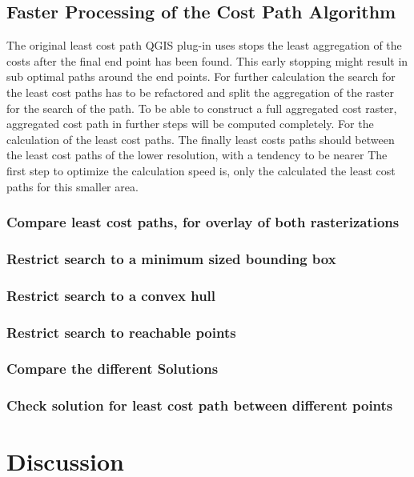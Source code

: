 \documentclass[acmtog]{acmart}
\begin{document}

	\subsection{Faster Processing of the Cost Path Algorithm}
	The original least cost path QGIS plug-in uses stops the least aggregation of the costs after the final end point has been found.
	This early stopping might result in sub optimal paths around the end points.
	For further calculation the search for the least cost paths has to be refactored and split the aggregation of the raster for the search of the path.
	To be able to construct a full aggregated cost raster, aggregated cost path in further steps will be computed completely.
	For the calculation of the least cost paths.
	The finally least costs paths should between the least cost paths of the lower resolution, with a tendency to be nearer
	The first step to optimize the calculation speed is, only the calculated the least cost paths for this smaller area. 
	\subsubsection{Compare least cost paths, for overlay of both rasterizations}
	\subsubsection{Restrict search to a minimum sized bounding box}
	\subsubsection{Restrict search to a convex hull}
	\subsubsection{Restrict search to reachable points}

	\subsubsection{Compare the different Solutions}
	\subsubsection{Check solution for least cost path between different points}
	
	\section{Discussion}
\end{document}
